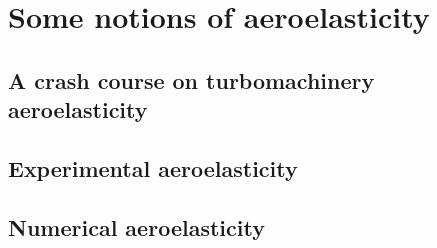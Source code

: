 \chapter{Some notions of aeroelasticity}
\label{cha:ael}

\chabstract{}

\minitoc
\newpage

\section{A crash course on turbomachinery aeroelasticity}
\label{sec:ael_crash_course}


\section{Experimental aeroelasticity}
\label{sec:experimental_ael}


\section{Numerical aeroelasticity}
\label{sec:numerical_ael}





\chconclu{}
